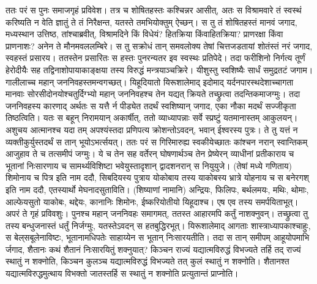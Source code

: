 \adhyAya
{}
\vakya ततः परं स पुनः समाजगृहं प्रविवेश।
\vakya तत्र च शोषितहस्तः कश्चिन्नर आसीत्, अतः स विश्रामवारे तं स्वस्थं करिष्यति न वेति ज्ञातुं ते तं निरैक्षन्त, यतस्ते तमभियोक्तुम् ऐच्छन्।
\vakya स तु तं शोषितहस्तं मानवं जगाद, मध्यस्थान उत्तिष्ठ, तांश्चाब्रवीत्,
\vakya विश्रामदिने किं विधेयं? हितक्रिया किंवाहितक्रिया? प्राणरक्षा किंवा प्राणनाशः? अनेन ते मौनमवललम्बिरे।
\vakya स तु सक्रोधं तान् समवलोक्य तेषां चित्तजडतायां शोतंस्तं नरं जगाद, स्वहस्तं प्रसारय। ततस्तेन प्रसारितः स हस्तः पुनरन्यतर इव स्वस्थः प्रतिपेदे।
\vakya तदा फरीशिनो निर्गत्य तूर्णं हेरोदीयैः सह तद्विनाशोपायाकाङ्क्षया तस्य विरुद्धं मन्त्रयाञ्चक्रिरे।
\vakya यीशुस्तु स्वशिष्यैः सार्धं समुद्रतटं जगाम। गालीलाच्च महान् जननिवहस्तमन्वगच्छत्।
\vakya यिहूदियातो यिरूशालेमाद् इदोमाद् यर्दनपारस्थदेशाच्चागता मानवाः सोरसीदोनयोश्चतुर्दिग्भ्यो महान् जननिवहश्च तेन यद्यत् क्रियते तच्छ्रुत्वा तदन्तिकमाजग्मुः।
\vakya तदा जननिवहस्य कारणाद् अर्थतः स यत्तै र्न पीड्येत तदर्थं स्वशिष्यान् जगाद, एका नौका मदर्थं सज्जीकृता तिष्ठत्विति।
\vakya यतः स बहून् निरामयान् अकार्षीत्, ततो व्याध्यापन्नाः सर्वे स्प्रष्टुं यतमानास्तम् आकुलयन्।
\vakya अशुचय आत्मानश्च यदा तम् अपश्यंस्तदा प्रणिपत्य क्रोशन्तोऽवदन्, भवान् ईश्वरस्य पुत्रः।
\vakya ते तु यत्तं न व्यक्तीकुर्युस्तदर्थं स तान् भूयोऽभर्त्सयत्।
\vakya ततः परं स गिरिमारुह्य स्वकीयेच्छातः कांश्चन नरान् स्वान्तिकम् आजुहाव ते च तत्समीपं जग्मुः।
\vakya ये च तेन सह वर्तेरन् घोषणार्थञ्च तेन प्रेष्येरन्
\vakya व्याधीनां प्रतीकाराय च भूतानां निःसारणाय च सामर्थ्यविशिष्टा भवेयुस्तादृशान् द्वादशनरान् स नियुयुजे।
\vakya (तेषां मध्ये गणिताय) शिमोनाय च पित्र इति नाम ददौ,
\vakya सिबदियस्य पुत्राय योकोबाय तस्य याकोबस्य भ्रात्रे योहनाय च स बनेरगश् इति नाम ददौ, एतस्यार्थो मेघनादसुताविति।
\vakya (शिष्याणां नामानि) अन्द्रियः, फिलिपः, बर्थलमयः, मथिः, थोमाः, आल्फेयसुतो याकोबः, थद्देयः, कानानिः शिमोनः,
\vakya ईष्करियोतीयो यिहूदाश्च। एष एव तस्य समर्पयिताभूत्।
\vakya अपरं ते गृहं प्रविवशुः। पुनश्च महान् जननिवहः समागमत्, ततस्त आहारमपि कर्तुं नाशक्नुवन्।
\vakya तच्छ्रुत्वा तु तस्य बन्धुजनास्तं धर्तुं निर्जग्मुः, यतस्तेऽवदन् स हतबुद्धिरभूत्।
\vakya यिरूशालेमाद् आगताः शास्त्राध्यापकाश्चाहुः, स बेल्‌सबूलेनाविष्टः, भूतानामधिपतेः साहाय्येन स भूतान् निःसारयतीति।
\vakya तदा स तान् समीपम् आहूयोपमाभि र्जगाद, शैतानः कथं शैतानं निःसारयितुं शक्नुयात्?
\vakya किञ्चन राज्यं यद्यात्मविरुद्धं विभज्यते तर्हि तद् राज्यं स्थातुं न शक्नोति,
\vakya किञ्चन कुलञ्च यद्यात्मविरुद्धं विभज्यते तत् कुलं स्थातुं न शक्नोति।
\vakya शैतानश्त यद्यात्मविरुद्धमुत्थाय विभक्तो जातस्तर्हि स स्थातुं न शक्नोति प्रत्युतान्तं प्राप्नोति।
